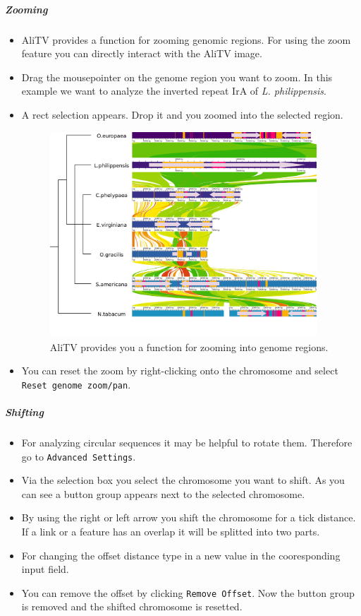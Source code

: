 \documentclass[a4paper]{scrartcl}
\begin{document}
\subparagraph*{Zooming}
\begin{itemize}
	\item AliTV provides a function for zooming genomic regions. For using the zoom feature you can directly interact with the AliTV image.
	\item Drag the mousepointer on the genome region you want to zoom. In this example we want to analyze the inverted repeat IrA of \textit{L. philippensis}.
	\item A rect selection appears. Drop it and you zoomed into the selected region.
	\begin{figure}[H]
		\centering
		\includegraphics[width=10cm]{zoom.png}
		\caption{AliTV provides you a function for zooming into genome regions.}
	\end{figure}
	\item You can reset the zoom by right-clicking onto the chromosome and select \texttt{Reset genome zoom/pan}.
\end{itemize}

\subparagraph*{Shifting}
\begin{itemize}
	\item For analyzing circular sequences it may be helpful to rotate them. Therefore go to \texttt{Advanced Settings}.
	\item Via the selection box you select the chromosome you want to shift. As you can see a button group appears next to the selected chromosome.
	\item By using the right or left arrow you shift the chromosome for a tick distance. If a link or a feature has an overlap it will be splitted into two parts.
	\item For changing the offset distance type in a new value in the cooresponding input field.
	\item You can remove the offset by clicking \texttt{Remove Offset}. Now the button group is removed and the shifted chromosome is resetted.
	
\end{itemize}
\end{document}
